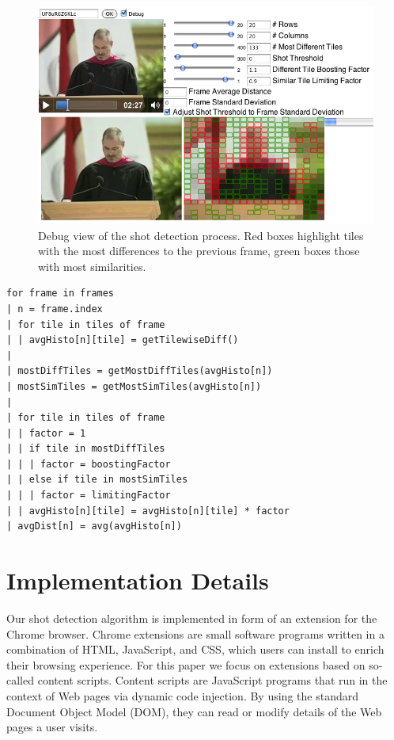 \documentclass{acm_proc_article-sp}
\begin{document}
\begin{figure}
\begin{center}
   \includegraphics[width=0.9\linewidth]{./resources/algorithm.png}
\end{center}
   \caption{Debug view of the shot detection process. Red boxes highlight tiles with the most differences to the previous frame, green boxes those with most similarities.}
\label{fig:algorithm}
\end{figure}

\begin{lstlisting}[caption=Pseudocode of shot detection algorithm., label=code:algorithm, float]
for frame in frames
| n = frame.index  
| for tile in tiles of frame      
| | avgHisto[n][tile] = getTilewiseDiff()
|
| mostDiffTiles = getMostDiffTiles(avgHisto[n])
| mostSimTiles = getMostSimTiles(avgHisto[n])
|
| for tile in tiles of frame    
| | factor = 1  
| | if tile in mostDiffTiles
| | | factor = boostingFactor
| | else if tile in mostSimTiles
| | | factor = limitingFactor
| | avgHisto[n][tile] = avgHisto[n][tile] * factor
| avgDist[n] = avg(avgHisto[n])
\end{lstlisting}

\section{Implementation Details} \label{sec:implementation}
Our shot detection algorithm is implemented in form of an extension for the Chrome browser. Chrome extensions are small software programs written in a combination of HTML, JavaScript, and CSS, which users can install to enrich their browsing experience. For this paper we focus on extensions based on so-called content scripts. Content scripts are JavaScript programs that run in the context of Web pages via dynamic code injection. By using the standard Document Object Model (DOM), they can read or modify details of the Web pages a user visits.
\end{document}
